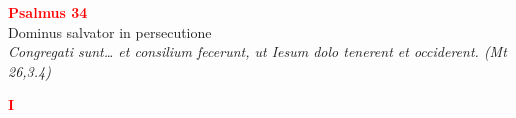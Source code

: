 


\def\greinitialformat#1{%
{\fontsize{39}{39}\selectfont #1}%
}




\vspace{0.3cm}
\begin{center}
 \textcolor{red}{\large \bf Psalmus 34}\\
Dominus salvator in persecutione\\
\textit{\small Congregati sunt… et consilium fecerunt, ut Iesum dolo tenerent et occiderent. (Mt 26,3.4)}
\end{center}
\begin{center}
\textcolor{red}{\bf I}
\end{center}
